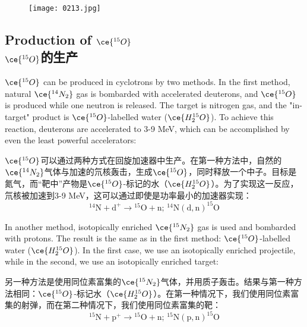 \documentclass[dvipsnames, svgnames,a4paper,11pt]{article}
\begin{document}
\begin{figure}[h]
	\centering
    \texttt{[image: 0213.jpg]}  
 \label{fig266}
\end{figure}


\subsection{Production of \(\ce{^{15}O}\)\\ \(\ce{^{15}O}\)的生产}  

\(\ce{^{15}O}\) can be produced in cyclotrons by two methods. In the first method, natural \(\ce{^{14}N_2}\) gas is bombarded with accelerated deuterons, and \(\ce{^{15}O}\) is produced while one neutron is released. The target is nitrogen gas, and the "in-target" product is \(\ce{^{15}O}\)-labelled water (\(\ce{H_2^{15}O}\)). To achieve this reaction, deuterons are accelerated to 3-9 MeV, which can be accomplished by even the least powerful accelerators:

\(\ce{^{15}O}\)可以通过两种方式在回旋加速器中生产。在第一种方法中，自然的\(\ce{^{14}N_2}\)气体与加速的氘核轰击，生成\(\ce{^{15}O}\)，同时释放一个中子。目标是氮气，而“靶中”产物是\(\ce{^{15}O}\)-标记的水（\(\ce{H_2^{15}O}\)）。为了实现这一反应，氘核被加速到3-9 MeV，这可以通过即使是功率最小的加速器实现：
\[
\mathrm{^{14}N + d^{+} \rightarrow {}^{15}O + n; \, ^{14}N(d,n)^{15}O}
\]

In another method, isotopically enriched \(\ce{^{15}N_2}\) gas is used and bombarded with protons. The result is the same as in the first method: \(\ce{^{15}O}\)-labelled water (\(\ce{H_2^{15}O}\)). In the first case, we use an isotopically enriched projectile, while in the second, we use an isotopically enriched target:

另一种方法是使用同位素富集的\(\ce{^{15}N_2}\)气体，并用质子轰击。结果与第一种方法相同：\(\ce{^{15}O}\)-标记水（\(\ce{H_2^{15}O}\)）。在第一种情况下，我们使用同位素富集的射弹，而在第二种情况下，我们使用同位素富集的靶：
\[
\mathrm{^{15}N + p^{+} \rightarrow {}^{15}O + n; \, ^{15}N(p,n)^{15}O}
\]
\end{document}
